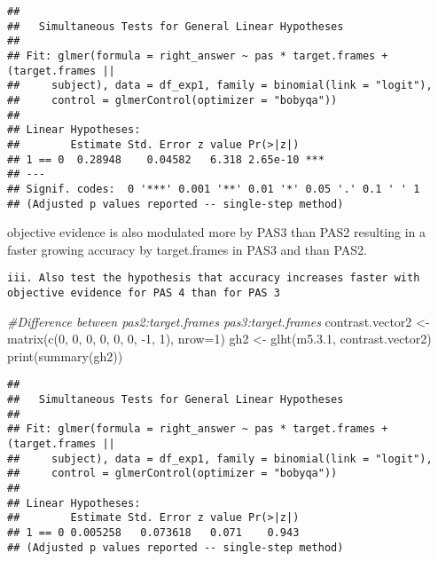 \documentclass[
]{article}
\newenvironment{Shaded}{\begin{snugshade}}{\end{snugshade}}
\newcommand{\AttributeTok}[1]{\textcolor[rgb]{0.77,0.63,0.00}{#1}}
\newcommand{\CommentTok}[1]{\textcolor[rgb]{0.56,0.35,0.01}{\textit{#1}}}
\newcommand{\DecValTok}[1]{\textcolor[rgb]{0.00,0.00,0.81}{#1}}
\newcommand{\FloatTok}[1]{\textcolor[rgb]{0.00,0.00,0.81}{#1}}
\newcommand{\FunctionTok}[1]{\textcolor[rgb]{0.00,0.00,0.00}{#1}}
\newcommand{\NormalTok}[1]{#1}
\newcommand{\OtherTok}[1]{\textcolor[rgb]{0.56,0.35,0.01}{#1}}
\newcommand{\SpecialCharTok}[1]{\textcolor[rgb]{0.00,0.00,0.00}{#1}}
\begin{document}
\begin{verbatim}
## 
##   Simultaneous Tests for General Linear Hypotheses
## 
## Fit: glmer(formula = right_answer ~ pas * target.frames + (target.frames || 
##     subject), data = df_exp1, family = binomial(link = "logit"), 
##     control = glmerControl(optimizer = "bobyqa"))
## 
## Linear Hypotheses:
##        Estimate Std. Error z value Pr(>|z|)    
## 1 == 0  0.28948    0.04582   6.318 2.65e-10 ***
## ---
## Signif. codes:  0 '***' 0.001 '**' 0.01 '*' 0.05 '.' 0.1 ' ' 1
## (Adjusted p values reported -- single-step method)
\end{verbatim}

objective evidence is also modulated more by PAS3 than PAS2 resulting in
a faster growing accuracy by target.frames in PAS3 and than PAS2.

\begin{verbatim}
iii. Also test the hypothesis that accuracy increases faster with objective evidence for PAS 4 than for PAS 3
\end{verbatim}

\begin{Shaded}
\begin{Highlighting}[]
\CommentTok{\#Difference between pas2:target.frames pas3:target.frames}
\NormalTok{contrast.vector2 }\OtherTok{\textless{}{-}} \FunctionTok{matrix}\NormalTok{(}\FunctionTok{c}\NormalTok{(}\DecValTok{0}\NormalTok{, }\DecValTok{0}\NormalTok{, }\DecValTok{0}\NormalTok{, }\DecValTok{0}\NormalTok{, }\DecValTok{0}\NormalTok{, }\DecValTok{0}\NormalTok{, }\SpecialCharTok{{-}}\DecValTok{1}\NormalTok{, }\DecValTok{1}\NormalTok{), }\AttributeTok{nrow=}\DecValTok{1}\NormalTok{)}
\NormalTok{gh2 }\OtherTok{\textless{}{-}} \FunctionTok{glht}\NormalTok{(m5.}\FloatTok{3.1}\NormalTok{, contrast.vector2)}
\FunctionTok{print}\NormalTok{(}\FunctionTok{summary}\NormalTok{(gh2))}
\end{Highlighting}
\end{Shaded}

\begin{verbatim}
## 
##   Simultaneous Tests for General Linear Hypotheses
## 
## Fit: glmer(formula = right_answer ~ pas * target.frames + (target.frames || 
##     subject), data = df_exp1, family = binomial(link = "logit"), 
##     control = glmerControl(optimizer = "bobyqa"))
## 
## Linear Hypotheses:
##        Estimate Std. Error z value Pr(>|z|)
## 1 == 0 0.005258   0.073618   0.071    0.943
## (Adjusted p values reported -- single-step method)
\end{verbatim}
\end{document}
